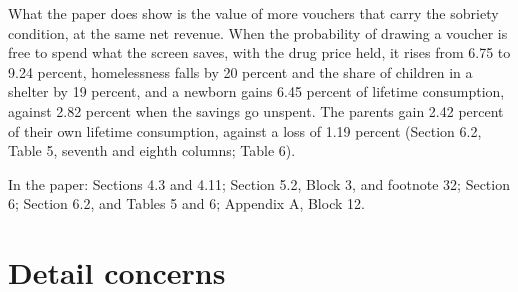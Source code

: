 \documentclass[11pt]{article}
\begin{document}
\begin{response}
What the paper does show is the value of more vouchers that carry the sobriety condition,
at the same net revenue. When the probability of drawing a voucher is free to spend what
the screen saves, with the drug price held, it rises from 6.75 to 9.24 percent,
homelessness falls by 20 percent and the share of children in a shelter by 19 percent, and
a newborn gains 6.45 percent of lifetime consumption, against 2.82 percent when the savings
go unspent. The parents gain 2.42 percent of their own lifetime consumption, against a loss
of 1.19 percent (Section 6.2, Table 5, seventh and eighth columns; Table 6).

In the paper: Sections 4.3 and 4.11; Section 5.2, Block 3, and footnote 32; Section 6;
Section 6.2, and Tables 5 and 6; Appendix A, Block 12.
\end{response}

\section*{Detail concerns}
\end{document}
